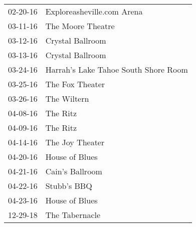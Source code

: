 \begin{supertabular}{p{0.25\columnwidth}p{0.75\columnwidth}}
 02-20-16 &            Exploreasheville.com Arena \\
 03-11-16 &                     The Moore Theatre \\
 03-12-16 &                      Crystal Ballroom \\
 03-13-16 &                      Crystal Ballroom \\
 03-24-16 &  Harrah’s Lake Tahoe South Shore Room \\
 03-25-16 &                       The Fox Theater \\
 03-26-16 &                           The Wiltern \\
 04-08-16 &                              The Ritz \\
 04-09-16 &                              The Ritz \\
 04-14-16 &                      The Joy  Theater \\
 04-20-16 &                        House of Blues \\
 04-21-16 &                       Cain's Ballroom \\
 04-22-16 &                           Stubb's BBQ \\
 04-23-16 &                        House of Blues \\
 12-29-18 &                        The Tabernacle \\
\end{supertabular}

